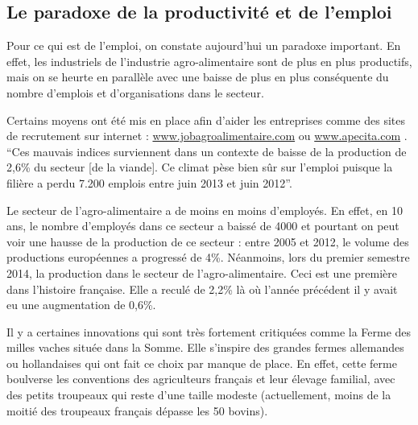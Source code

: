 \documentclass[a4paper,12pt]{report}
\begin{document}
		\subsection{Le paradoxe de la productivité et de l'emploi}
			Pour ce qui est de l’emploi, on constate aujourd'hui un paradoxe important. En effet, les industriels de l’industrie agro-alimentaire sont de plus en plus productifs, mais on se heurte en parallèle avec une baisse de plus en plus conséquente du nombre d’emplois et d’organisations dans le secteur.
			
			Certains moyens ont été mis en place afin d’aider les entreprises comme des sites de recrutement sur internet : \url{www.jobagroalimentaire.com} ou \url{www.apecita.com} .  “Ces mauvais indices surviennent dans un contexte de baisse de la production de 2,6\% du secteur [de la viande]. Ce climat pèse bien sûr sur l'emploi puisque la filière a perdu 7.200 emplois entre juin 2013 et juin 2012”\cite{DeficitCommercialViandeAggrave}.
			
			Le secteur de l’agro-alimentaire a de moins en moins d’employés. En effet, en 10 ans, le nombre d’employés dans ce secteur a baissé de 4000\cite{IAAHeritageAgricoleBretagne} et pourtant on peut voir une hausse de la production de ce secteur : entre 2005 et 2012, le volume des productions européennes a progressé de 4\%\cite{HausseModereeVenteProduitsAA2012}. Néanmoins, lors du premier semestre 2014, la production dans le secteur de l’agro-alimentaire. Ceci est une première dans l’histoire française. Elle a reculé de 2,2\% là où l’année précédent il y avait eu une augmentation de 0,6\%\cite{ReculHistoriqueProductionAAFrance}.
			
			Il y a certaines innovations qui sont très fortement critiquées comme la Ferme des milles vaches située dans la Somme. Elle s'inspire des grandes fermes allemandes ou hollandaises qui ont fait ce choix par manque de place. En effet, cette ferme boulverse les conventions des agriculteurs français et leur élevage familial, avec des petits troupeaux qui reste d’une taille modeste (actuellement, moins de la moitié des troupeaux français dépasse les 50 bovins).
			
\end{document}
